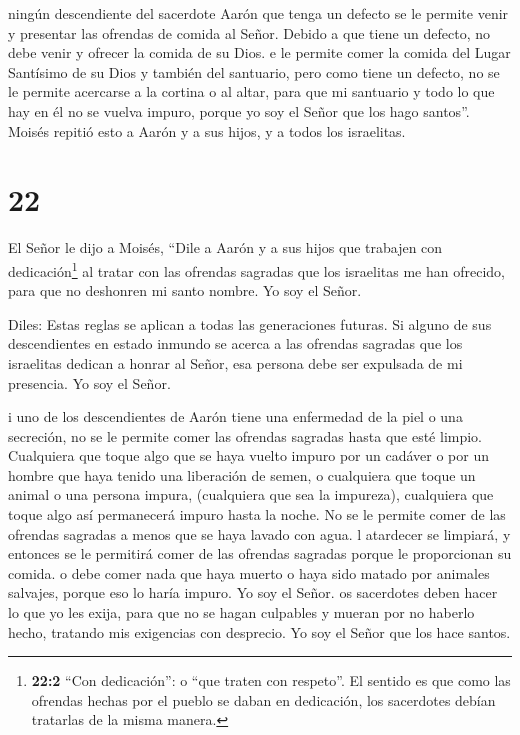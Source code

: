  ningún descendiente del sacerdote Aarón que tenga un
defecto se le permite venir y presentar las ofrendas de comida al Señor.
Debido a que tiene un defecto, no debe venir y ofrecer la comida de su
Dios.  e le permite comer la comida del Lugar Santísimo de
su Dios y también del santuario,  pero como tiene un
defecto, no se le permite acercarse a la cortina o al altar, para que mi
santuario y todo lo que hay en él no se vuelva impuro, porque yo soy el
Señor que los hago santos''.  Moisés repitió esto a Aarón y
a sus hijos, y a todos los israelitas.

\hypertarget{section-21}{%
\section{22}\label{section-21}}

 El Señor le dijo a Moisés,  ``Dile a Aarón y a
sus hijos que trabajen con dedicación\footnote{\textbf{22:2} ``Con
  dedicación'': o ``que traten con respeto''. El sentido es que como las
  ofrendas hechas por el pueblo se daban en dedicación, los sacerdotes
  debían tratarlas de la misma manera.} al tratar con las ofrendas
sagradas que los israelitas me han ofrecido, para que no deshonren mi
santo nombre. Yo soy el Señor.

 Diles: Estas reglas se aplican a todas las generaciones
futuras. Si alguno de sus descendientes en estado inmundo se acerca a
las ofrendas sagradas que los israelitas dedican a honrar al Señor, esa
persona debe ser expulsada de mi presencia. Yo soy el Señor.

 i uno de los descendientes de Aarón tiene una enfermedad de
la piel o una secreción, no se le permite comer las ofrendas sagradas
hasta que esté limpio. Cualquiera que toque algo que se haya vuelto
impuro por un cadáver o por un hombre que haya tenido una liberación de
semen,  o cualquiera que toque un animal o una persona
impura, (cualquiera que sea la impureza),  cualquiera que
toque algo así permanecerá impuro hasta la noche. No se le permite comer
de las ofrendas sagradas a menos que se haya lavado con agua.
 l atardecer se limpiará, y entonces se le permitirá comer
de las ofrendas sagradas porque le proporcionan su comida. 
o debe comer nada que haya muerto o haya sido matado por animales
salvajes, porque eso lo haría impuro. Yo soy el Señor.  os
sacerdotes deben hacer lo que yo les exija, para que no se hagan
culpables y mueran por no haberlo hecho, tratando mis exigencias con
desprecio. Yo soy el Señor que los hace santos.


